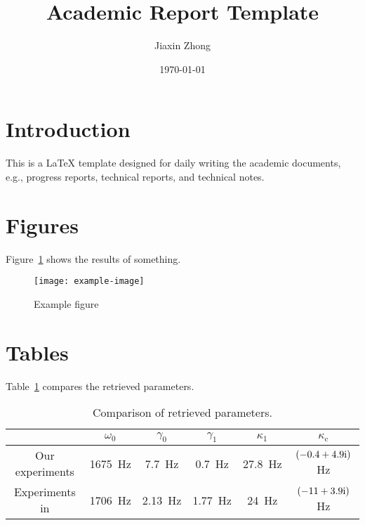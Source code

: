 \documentclass{article}
\title{\textbf{Academic Report Template}}
\author{Jiaxin Zhong}
\date{\today}
\begin{document}
\maketitle
\thispagestyle{firststyle}

\section{Introduction}
This is a \LaTeX{} template designed for daily writing the academic documents, e.g., progress reports, technical reports, and technical notes.

\lipsum[1]

\lipsum[2]

\lipsum[3]

\lipsum[4]

\lipsum[5]

\lipsum[6]

\section{Figures}
Figure~\ref{fig:39:f020390} shows the results of something.
\begin{figure}[!htb]
    \centering
    \texttt{[image: example-image]}
    \caption{Example figure}
    \label{fig:39:f020390}
\end{figure}

\section{Tables}
Table~\ref{tab:f20} compares the retrieved parameters.
\begin{table}[!htb]
    \centering
    \caption{Comparison of retrieved parameters.}
    \begin{tabular}{cccccc}
        \toprule
         & $\omega_0$ 
         & $\gamma_0$
         & $\gamma_1$
         & $\kappa_1$
         & $\kappa_\mathrm{c}$
         \\
        \midrule
        Our experiments 
         & 
         1675~Hz
         &
         7.7~Hz
         & 
         0.7~Hz
         &
         27.8~Hz
         & 
         $\qty(-0.4+4.9\mathrm{i})$ Hz\\
         Experiments in \cite{Zhang2021AcousticNonHermitianSkin}
         & 
         1706~Hz
         &
         2.13~Hz
         & 
         1.77~Hz
         &
         24~Hz
         & 
         $\qty(-11+3.9\mathrm{i})$ Hz\\
        \bottomrule
    \end{tabular}
    \label{tab:f20}
\end{table}
\end{document}
